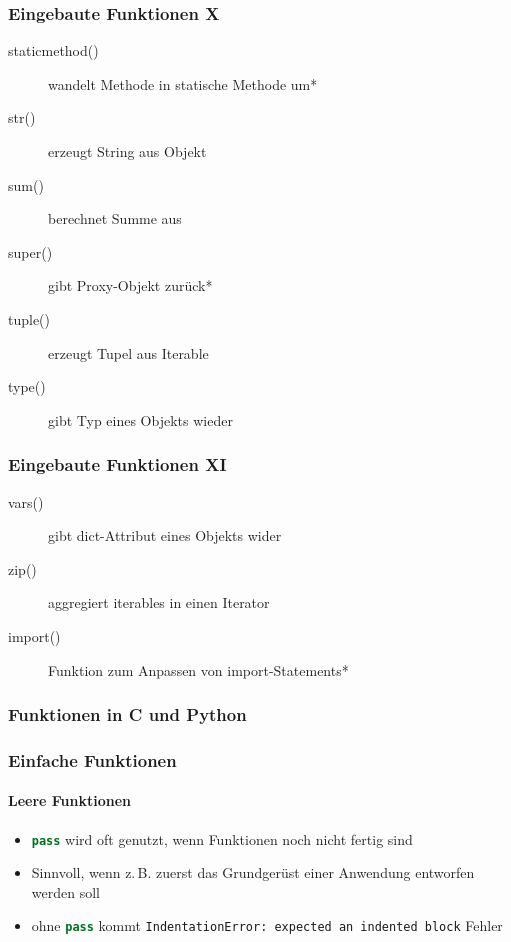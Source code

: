 \documentclass[ngerman]{beamer}
\newcommand{\ta}[1]{\textattachfile[color=1 0 0]{#1}{Code}}
\begin{document}
\begin{frame}
\frametitle{Eingebaute Funktionen X}

\begin{description}
\item[staticmethod()] wandelt Methode in statische Methode um*
\item[str()] erzeugt String aus Objekt
\item[sum()] berechnet Summe aus 
\item[super()] gibt Proxy-Objekt zurück*
\item[tuple()] erzeugt Tupel aus Iterable
\item[type()] gibt Typ eines Objekts wieder
\end{description}
\end{frame}


\begin{frame}
\frametitle{Eingebaute Funktionen XI}

\begin{description}
\item[vars()] gibt dict-Attribut eines Objekts wider
\item[zip()] aggregiert iterables in einen Iterator
\item[\textunderscore \textunderscore import()\textunderscore \textunderscore] Funktion zum Anpassen von import-Statements*
\end{description}



\end{frame}


\begin{frame}[containsverbatim]
\frametitle{Funktionen in C und Python}

\vspace*{-0.5em}




\end{frame}

\begin{frame}[containsverbatim]
\frametitle{Einfache Funktionen}
\framesubtitle{Leere Funktionen}

\begin{itemize}
\item \lstinline[language={Python}]{pass} wird oft genutzt, wenn Funktionen noch nicht fertig sind
\item Sinnvoll, wenn z.\,B. zuerst das Grundgerüst einer Anwendung entworfen werden soll
\item ohne \lstinline[language={Python}]{pass} kommt \texttt{IndentationError: expected an indented block} Fehler
\end{itemize}

%

\end{frame}
\end{document}
